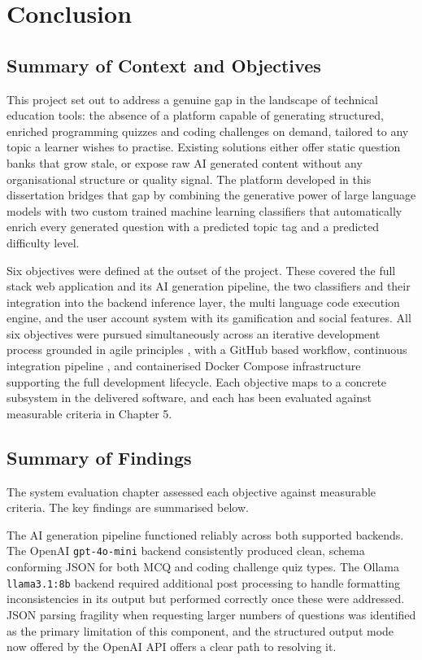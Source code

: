 \chapter{Conclusion}

\section{Summary of Context and Objectives}

This project set out to address a genuine gap in the landscape of
technical education tools: the absence of a platform capable of
generating structured, enriched programming quizzes and coding
challenges on demand, tailored to any topic a learner wishes to
practise. Existing solutions either offer static question banks that
grow stale, or expose raw AI generated content without any
organisational structure or quality signal. The platform developed in
this dissertation bridges that gap by combining the generative power
of large language models \cite{brown2020gpt3,touvron2023llama} with
two custom trained machine learning classifiers that automatically
enrich every generated question with a predicted topic tag and a
predicted difficulty level.

Six objectives were defined at the outset of the project. These
covered the full stack web application and its AI generation pipeline,
the two classifiers and their integration into the backend inference
layer, the multi language code execution engine, and the user account
system with its gamification and social features. All six objectives
were pursued simultaneously across an iterative development process
grounded in agile principles \cite{agilemanifesto2001,beck2004xp},
with a GitHub based workflow, continuous integration pipeline
\cite{githubactions2025}, and containerised Docker Compose
infrastructure \cite{merkel2014docker,dockercompose2025} supporting
the full development lifecycle. Each objective maps to a concrete
subsystem in the delivered software, and each has been evaluated
against measurable criteria in Chapter 5.

\section{Summary of Findings}

The system evaluation chapter assessed each objective against
measurable criteria. The key findings are summarised below.

The AI generation pipeline functioned reliably across both supported
backends. The OpenAI \texttt{gpt-4o-mini} backend consistently
produced clean, schema conforming JSON for both MCQ and coding
challenge quiz types. The Ollama \texttt{llama3.1:8b} backend
required additional post processing to handle formatting
inconsistencies in its output but performed correctly once these were
addressed. JSON parsing fragility when requesting larger numbers of
questions was identified as the primary limitation of this component,
and the structured output mode now offered by the OpenAI API
\cite{openai2024structured} offers a clear path to resolving it.

